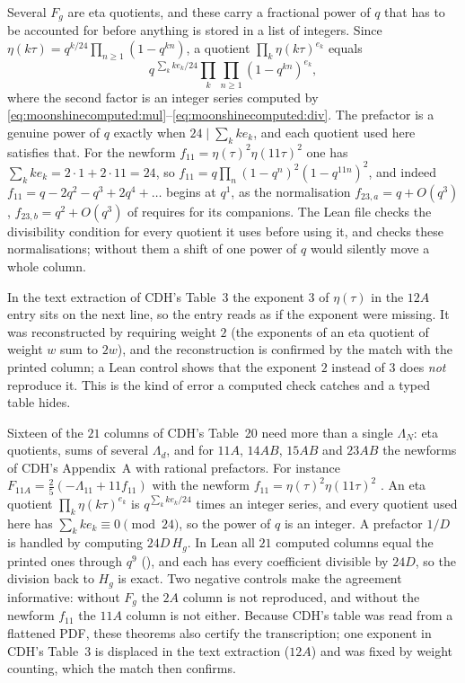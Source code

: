Several $F_g$ are eta quotients, and these carry a fractional power of $q$ that has to be
accounted for before anything is stored in a list of integers. Since
$\eta(k\tau)=q^{k/24}\prod_{n\ge1}(1-q^{kn})$, a quotient
$\prod_k\eta(k\tau)^{e_k}$ equals
\begin{equation}\label{eq:moonshinecomputed:etaq}
  q^{\,\sum_kke_k/24}\prod_k\prod_{n\ge1}(1-q^{kn})^{e_k},
\end{equation}
where the second factor is an integer series computed by
\eqref{eq:moonshinecomputed:mul}--\eqref{eq:moonshinecomputed:div}. The prefactor is a
genuine power of $q$ exactly when $24\mid\sum_kke_k$, and each quotient used here satisfies
that. For the newform $f_{11}=\eta(\tau)^2\eta(11\tau)^2$ one has
$\sum_kke_k=2\cdot1+2\cdot11=24$, so $f_{11}=q\prod_n(1-q^n)^2(1-q^{11n})^2$, and indeed
$f_{11}=q-2q^2-q^3+2q^4+\dots$ begins at $q^1$, as the normalisation
$f_{23,a}=q+O(q^3)$, $f_{23,b}=q^2+O(q^3)$ of 
requires for its companions. The Lean file checks the divisibility condition for every
quotient it uses before using it, and checks these normalisations; without them a shift of
one power of $q$ would silently move a whole column.

\begin{pitfallbox}
In the text extraction of CDH's Table~3 the exponent $3$ of $\eta(\tau)$ in the $12A$ entry
sits on the next line, so the entry reads as if the exponent were missing. It was
reconstructed by requiring weight $2$ (the exponents of an eta quotient of weight $w$ sum to
$2w$), and the reconstruction is confirmed by the match with the printed column; a Lean
control shows that the exponent $2$ instead of $3$ does \emph{not} reproduce it. This is the
kind of error a computed check catches and a typed table hides.
\end{pitfallbox}

Sixteen of the $21$ columns of CDH's Table~20 need more than a single $\Lambda_N$: eta
quotients, sums of several $\Lambda_d$, and for $11A$, $14AB$, $15AB$ and $23AB$ the
newforms of CDH's Appendix~A with rational prefactors. For instance
$F_{11A}=\tfrac25(-\Lambda_{11}+11f_{11})$  with the newform
$f_{11}=\eta(\tau)^2\eta(11\tau)^2$ . An eta quotient
$\prod_k\eta(k\tau)^{e_k}$ is $q^{\sum_kke_k/24}$ times an integer series, and every
quotient used here has $\sum_kke_k\equiv0\pmod{24}$, so the power of $q$ is an integer.
A prefactor $1/D$ is handled by computing $24D\,H_g$. In Lean all $21$ computed columns
equal the printed ones through $q^9$ (\TA), and each has every coefficient divisible by
$24D$, so the division back to $H_g$ is exact. Two negative controls make the agreement
informative: without $F_g$ the $2A$ column is not reproduced, and without the newform
$f_{11}$ the $11A$ column is not either. Because CDH's table was read from a flattened
PDF, these theorems also certify the transcription; one exponent in CDH's Table~3 is
displaced in the text extraction ($12A$) and was fixed by weight counting, which the
match then confirms.

